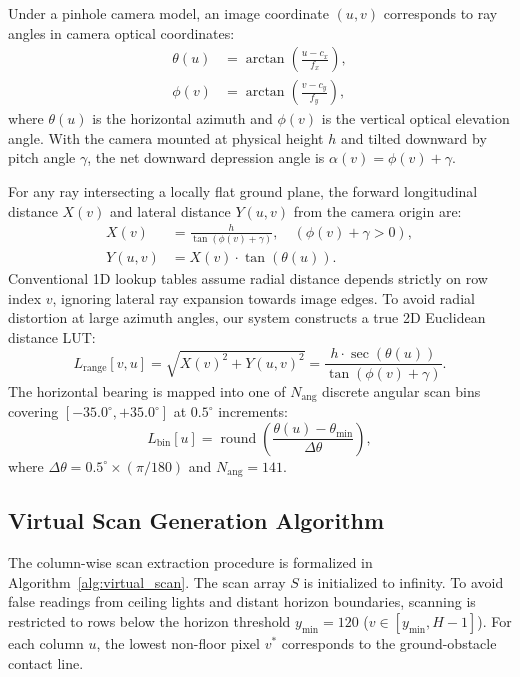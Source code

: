 \documentclass{ieeeaccess}
\begin{document}
Under a pinhole camera model, an image coordinate $(u, v)$ corresponds to ray angles in camera optical coordinates:
\begin{align}
  \theta(u) &= \arctan\left(\frac{u - c_x}{f_x}\right), \\
  \phi(v)   &= \arctan\left(\frac{v - c_y}{f_y}\right),
\end{align}
where $\theta(u)$ is the horizontal azimuth and $\phi(v)$ is the vertical optical elevation angle. With the camera mounted at physical height $h$ and tilted downward by pitch angle $\gamma$, the net downward depression angle is $\alpha(v) = \phi(v) + \gamma$.

For any ray intersecting a locally flat ground plane, the forward longitudinal distance $X(v)$ and lateral distance $Y(u, v)$ from the camera origin are:
\begin{align}
  X(v) &= \frac{h}{\tan(\phi(v) + \gamma)}, \quad (\phi(v) + \gamma > 0), \\
  Y(u, v) &= X(v) \cdot \tan(\theta(u)).
\end{align}
Conventional 1D lookup tables assume radial distance depends strictly on row index $v$, ignoring lateral ray expansion towards image edges. To avoid radial distortion at large azimuth angles, our system constructs a true 2D Euclidean distance LUT:
\begin{equation}
  L_{\mathrm{range}}[v, u] = \sqrt{X(v)^2 + Y(u, v)^2} = \frac{h \cdot \sec(\theta(u))}{\tan(\phi(v) + \gamma)}.
\end{equation}
The horizontal bearing is mapped into one of $N_{\mathrm{ang}}$ discrete angular scan bins covering $[-35.0^\circ, +35.0^\circ]$ at $0.5^\circ$ increments:
\begin{equation}
  L_{\mathrm{bin}}[u] = \operatorname{round}\left(\frac{\theta(u) - \theta_{\min}}{\Delta \theta}\right),
\end{equation}
where $\Delta \theta = 0.5^\circ \times (\pi / 180)$ and $N_{\mathrm{ang}} = 141$.

\subsection{Virtual Scan Generation Algorithm}
The column-wise scan extraction procedure is formalized in Algorithm~\ref{alg:virtual_scan}. The scan array $S$ is initialized to infinity. To avoid false readings from ceiling lights and distant horizon boundaries, scanning is restricted to rows below the horizon threshold $y_{\min} = 120$ ($v \in [y_{\min}, H-1]$). For each column $u$, the lowest non-floor pixel $v^*$ corresponds to the ground-obstacle contact line.
\end{document}
